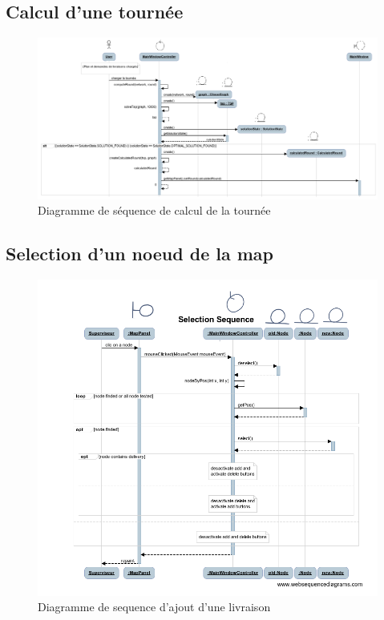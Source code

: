 \begin{landscape}
    \subsection{Calcul d'une tourn\'ee}

    \begin{figure}[h]
        \centering
        \includegraphics[width=240mm]{../diagrams/sequences/computeRound.png}
        \caption{Diagramme de s\'equence de calcul de la tourn\'ee}
        \label{diagram:seq_compute_round}
    \end{figure}
\end{landscape}
\pagebreak

\begin{landscape}
    \subsection{Selection d'un noeud de la map}

    \begin{figure}[h]
        \centering
        \includegraphics[width=0.5\linewidth]{../diagrams/sequences/selsequence.png}
        \caption{Diagramme de sequence d'ajout d'une livraison}
        \label{diagram:seq_add_delivery}
    \end{figure}
\end{landscape}
\pagebreak


